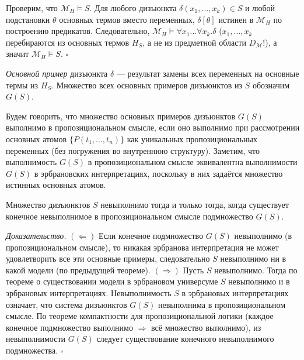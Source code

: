 \documentclass[10pt]{article}
\begin{document}
Проверим, что $\mathcal{M}_H\models S$. Для любого дизъюнкта $\delta(x_1,\dots,x_k)\in S$ и любой подстановки $\theta$ основных термов вместо переменных, $\delta[\theta]$ истинен в $\mathcal{M}_H$ по построению предикатов. Следовательно, $\mathcal{M}_H\models\forall x_1\dots\forall x_k.\delta$ ($x_1, \dots, x_k$ перебираются из основных термов $H_S$, а не из предметной области $D_\mathcal{M}$!), а значит $\mathcal{M}_H\models S$. \hfill $\square$

\textit{Основной пример} дизъюнкта $\delta$ — результат замены всех переменных на основные термы из $H_S$. Множество всех основных примеров дизъюнктов из $S$ обозначим $G(S)$.

Будем говорить, что множество основных примеров дизъюнктов $G(S)$ выполнимо в пропозициональном смысле, если оно выполнимо при рассмотрении основных атомов $\{P(t_1,\dots,t_n)\}$ как уникальных пропозициональных переменных (без погружения во внутреннюю структуру). Заметим, что выполнимость $G(S)$ в пропозициональном смысле эквивалентна выполнимости $G(S)$ в эрбрановских интерпретациях, поскольку в них задаётся множество истинных основных атомов.
\begin{theorem}[Эрбрана]
Множество дизъюнктов $S$ невыполнимо тогда и только тогда, когда существует конечное невыполнимое в пропозициональном смысле подмножество $G(S)$.
\end{theorem}
\textit{Доказательство.}
$(\Leftarrow)$ Если конечное подмножество $G(S)$ невыполнимо (в пропозициональном смысле), то никакая эрбранова интерпретация не может удовлетворить все эти основные примеры, следовательно $S$ невыполнимо ни в какой модели (по предыдущей теореме).
$(\Rightarrow)$ Пусть $S$ невыполнимо. Тогда по теореме о существовании модели в эрбрановом универсуме $S$ невыполнимо и в эрбрановых интерпретациях. Невыполнимость $S$ в эрбрановых интерпретациях означает, что система дизъюнктов $G(S)$ невыполнима в пропозициональном смысле. По теореме компактности для пропозициональной логики (каждое конечное подмножество выполнимо $\Rightarrow$ всё множество выполнимо), из невыполнимости $G(S)$ следует существование конечного невыполнимого подмножества. \hfill $\square$
\end{document}
